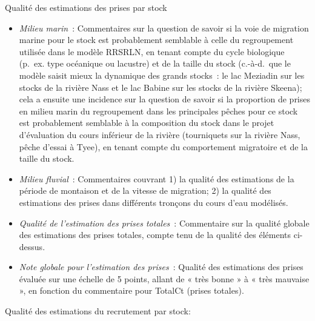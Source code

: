 \documentclass[french,11pt]{book}
\begin{document}
Qualité des estimations des prises par stock
\begin{itemize}

\item
  \emph{Milieu marin}~: Commentaires sur la question de savoir si la voie de migration marine pour le stock est probablement semblable à celle du regroupement utilisée dans le modèle RRSRLN, en tenant compte du cycle biologique (p.~ex. type océanique ou lacustre) et de la taille du stock (c.-à-d.~que le modèle saisit mieux la dynamique des grands stocks~: le lac Meziadin sur les stocks de la rivière Nass et le lac Babine sur les stocks de la rivière Skeena); cela a ensuite une incidence sur la question de savoir si la proportion de prises en milieu marin du regroupement dans les principales pêches pour ce stock est probablement semblable à la composition du stock dans le projet d'évaluation du cours inférieur de la rivière (tourniquets sur la rivière Nass, pêche d'essai à Tyee), en tenant compte du comportement migratoire et de la taille du stock.
\item
  \emph{Milieu fluvial}~: Commentaires couvrant 1) la qualité des estimations de la période de montaison et de la vitesse de migration; 2) la qualité des estimations des prises dans différents tronçons du cours d'eau modélisés.
\item
  \emph{Qualité de l'estimation des prises totales}~: Commentaire sur la qualité globale des estimations des prises totales, compte tenu de la qualité des éléments ci-dessus.
\item
  \emph{Note globale pour l'estimation des prises}~: Qualité des estimations des prises évaluée sur une échelle de 5 points, allant de « très bonne » à « très mauvaise », en fonction du commentaire pour TotalCt (prises totales).
\end{itemize}
Qualité des estimations du recrutement par stock:
\end{document}
